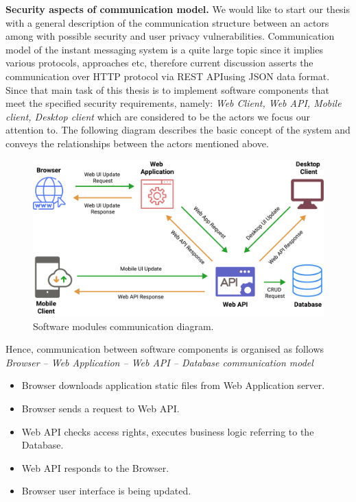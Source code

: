 \textbf{Security aspects of communication model.} We would like to start our thesis with a general description of the
communication structure between an actors among with possible security and user privacy vulnerabilities.
Communication model of the instant messaging system is a quite large topic since it implies various protocols, approaches etc,
therefore current discussion asserts the communication over HTTP protocol via REST API\@ using JSON data format.
Since that main task of this thesis is to implement software components that meet the specified security requirements,
namely: \textit{Web Client, Web API, Mobile client, Desktop client} which are
considered to be the actors we focus our attention to.
The following diagram describes the basic concept of the system and conveys the relationships between the
actors mentioned above.

\begin{figure}[H]
    \centering
    \includegraphics[width=1\textwidth]{Pictures/01_Software_modules_communication_diagram}
    \caption{Software modules communication diagram.}\label{fig:figure6}
\end{figure}

Hence, communication between software components is organised as follows\\

\textit{Browser -- Web Application -- Web API -- Database communication model}
\begin{itemize}
    \item Browser downloads application static files from Web Application server.
    \item Browser sends a request to Web API\@.
    \item Web API checks access rights, executes business logic referring to the Database.
    \item Web API responds to the Browser.
    \item Browser user interface is being updated.
\end{itemize}

